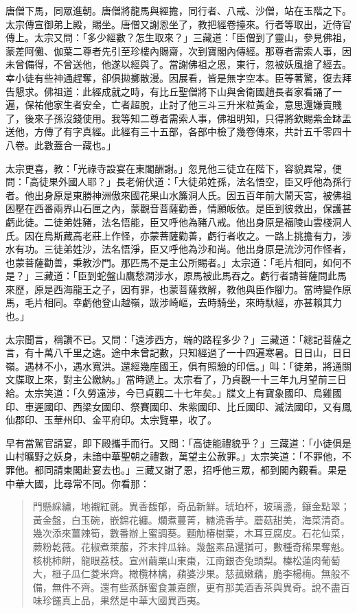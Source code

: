 唐僧下馬，同眾進朝。唐僧將龍馬與經擔，同行者、八戒、沙僧，站在玉階之下。太宗傳宣御弟上殿，賜坐。唐僧又謝恩坐了，教把經卷擡來。行者等取出，近侍官傳上。太宗又問：「多少經數？怎生取來？」三藏道：「臣僧到了靈山，參見佛祖，蒙差阿儺、伽葉二尊者先引至珍樓內賜齋，次到寶閣內傳經。那尊者需索人事，因未曾備得，不曾送他，他遂以經與了。當謝佛祖之恩，東行，忽被妖風搶了經去。幸小徒有些神通趕奪，卻俱拋擲散漫。因展看，皆是無字空本。臣等著驚，復去拜告懇求。佛祖道：此經成就之時，有比丘聖僧將下山與舍衛國趙長者家看誦了一遍，保祐他家生者安全，亡者超脫，止討了他三斗三升米粒黃金，意思還嫌賣賤了，後來子孫沒錢使用。我等知二尊者需索人事，佛祖明知，只得將欽賜紫金缽盂送他，方傳了有字真經。此經有三十五部，各部中檢了幾卷傳來，共計五千零四十八卷。此數蓋合一藏也。」

太宗更喜，教：「光祿寺設宴在東閣酬謝。」忽見他三徒立在階下，容貌異常，便問：「高徒果外國人耶？」長老俯伏道：「大徒弟姓孫，法名悟空，臣又呼他為孫行者。他出身原是東勝神洲傲來國花果山水簾洞人氏。因五百年前大鬧天宮，被佛祖困壓在西番兩界山石匣之內，蒙觀音菩薩勸善，情願皈依。是臣到彼救出，保護甚虧此徒。二徒弟姓豬，法名悟能，臣又呼他為豬八戒。他出身原是福陵山雲棧洞人氏。因在烏斯藏高老莊上作怪，亦蒙菩薩勸善，虧行者收之。一路上挑擔有力，涉水有功。三徒弟姓沙，法名悟淨，臣又呼他為沙和尚。他出身原是流沙河作怪者，也蒙菩薩勸善，秉教沙門。那匹馬不是主公所賜者。」太宗道：「毛片相同，如何不是？」三藏道：「臣到蛇盤山鷹愁澗涉水，原馬被此馬吞之。虧行者請菩薩問此馬來歷，原是西海龍王之子，因有罪，也蒙菩薩救解，教他與臣作腳力。當時變作原馬，毛片相同。幸虧他登山越嶺，跋涉崎嶇，去時騎坐，來時馱經，亦甚賴其力也。」

太宗聞言，稱讚不已。又問：「遠涉西方，端的路程多少？」三藏道：「總記菩薩之言，有十萬八千里之遠。途中未曾記數，只知經過了一十四遍寒暑。日日山，日日嶺。遇林不小，遇水寬洪。還經幾座國王，俱有照驗的印信。」叫：「徒弟，將通關文牒取上來，對主公繳納。」當時遞上。太宗看了，乃貞觀一十三年九月望前三日給。太宗笑道：「久勞遠涉，今已貞觀二十七年矣。」牒文上有寶象國印、烏雞國印、車遲國印、西梁女國印、祭賽國印、朱紫國印、比丘國印、滅法國印，又有鳳仙郡印、玉華州印、金平府印。太宗覽畢，收了。

早有當駕官請宴，即下殿攜手而行。又問：「高徒能禮貌乎？」三藏道：「小徒俱是山村曠野之妖身，未諳中華聖朝之禮數，萬望主公赦罪。」太宗笑道：「不罪他，不罪他。都同請東閣赴宴去也。」三藏又謝了恩，招呼他三眾，都到閣內觀看。果是中華大國，比尋常不同。你看那：
\begin{quote}
門懸綵繡，地襯紅氈。異香馥郁，奇品新鮮。琥珀杯，玻璃盞，鑲金點翠；黃金盤，白玉碗，嵌錦花纏。爛煮蔓菁，糖澆香芋。蘑菇甜美，海菜清奇。幾次添來薑辣筍，數番辦上蜜調葵。麵觔椿樹葉，木耳豆腐皮。石花仙菜，蕨粉乾薇。花椒煮萊菔，芥末拌瓜絲。幾盤素品還猶可，數種奇稀果奪魁。核桃柿餅，龍眼荔枝。宣州繭栗山東棗，江南銀杏兔頭梨。榛松蓮肉葡萄大，榧子瓜仁菱米齊。橄欖林檎，蘋婆沙果。慈菰嫩藕，脆李楊梅。無般不備，無件不齊。還有些蒸酥蜜食兼嘉饌，更有那美酒香茶與異奇。說不盡百味珍饈真上品，果然是中華大國異西夷。
\end{quote}

